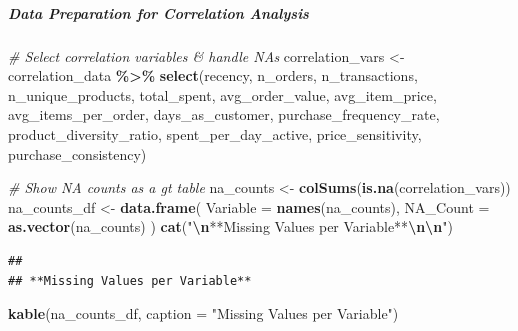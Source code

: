 \documentclass[
]{article}
\newenvironment{Shaded}{\begin{snugshade}}{\end{snugshade}}
\newcommand{\AttributeTok}[1]{\textcolor[rgb]{0.13,0.29,0.53}{#1}}
\newcommand{\CommentTok}[1]{\textcolor[rgb]{0.56,0.35,0.01}{\textit{#1}}}
\newcommand{\FunctionTok}[1]{\textcolor[rgb]{0.13,0.29,0.53}{\textbf{#1}}}
\newcommand{\NormalTok}[1]{#1}
\newcommand{\OtherTok}[1]{\textcolor[rgb]{0.56,0.35,0.01}{#1}}
\newcommand{\SpecialCharTok}[1]{\textcolor[rgb]{0.81,0.36,0.00}{\textbf{#1}}}
\newcommand{\StringTok}[1]{\textcolor[rgb]{0.31,0.60,0.02}{#1}}
\begin{document}
\subparagraph{Data Preparation for Correlation
Analysis}\label{data-preparation-for-correlation-analysis}

\begin{Shaded}
\begin{Highlighting}[]
\CommentTok{\# Select correlation variables \& handle NAs}
\NormalTok{correlation\_vars }\OtherTok{\textless{}{-}}\NormalTok{ correlation\_data }\SpecialCharTok{\%\textgreater{}\%}
  \FunctionTok{select}\NormalTok{(recency, n\_orders, n\_transactions, n\_unique\_products, }
\NormalTok{         total\_spent, avg\_order\_value, avg\_item\_price, avg\_items\_per\_order, }
\NormalTok{         days\_as\_customer, purchase\_frequency\_rate, }
\NormalTok{         product\_diversity\_ratio, spent\_per\_day\_active, }
\NormalTok{         price\_sensitivity, purchase\_consistency)}

\CommentTok{\# Show NA counts as a gt table}
\NormalTok{na\_counts }\OtherTok{\textless{}{-}} \FunctionTok{colSums}\NormalTok{(}\FunctionTok{is.na}\NormalTok{(correlation\_vars))}
\NormalTok{na\_counts\_df }\OtherTok{\textless{}{-}} \FunctionTok{data.frame}\NormalTok{(}
  \AttributeTok{Variable =} \FunctionTok{names}\NormalTok{(na\_counts),}
  \AttributeTok{NA\_Count =} \FunctionTok{as.vector}\NormalTok{(na\_counts)}
\NormalTok{)}
\FunctionTok{cat}\NormalTok{(}\StringTok{"}\SpecialCharTok{\textbackslash{}n}\StringTok{**Missing Values per Variable**}\SpecialCharTok{\textbackslash{}n\textbackslash{}n}\StringTok{"}\NormalTok{)}
\end{Highlighting}
\end{Shaded}

\begin{verbatim}
## 
## **Missing Values per Variable**
\end{verbatim}

\begin{Shaded}
\begin{Highlighting}[]
\FunctionTok{kable}\NormalTok{(na\_counts\_df, }\AttributeTok{caption =} \StringTok{"Missing Values per Variable"}\NormalTok{)}
\end{Highlighting}
\end{Shaded}
\end{document}
